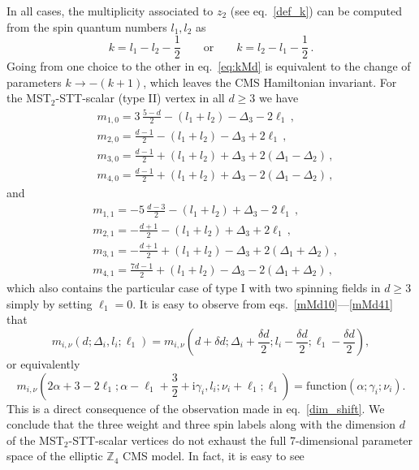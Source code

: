 \documentclass{article}
\def \Dg {\Delta}
\def \dg {\delta}
\def \ag {\alpha}
\def \cg {\gamma}
\def \Zs {\mathbb{Z}}
\begin{document}
In all cases, the multiplicity associated to $z_2$ (see eq.\ \eqref{def_k}) can be computed from the spin quantum numbers 
$l_1,l_2$ as 
\begin{equation} \label{eq:kMd} 
k = l_1 -l_2 - \frac{1}{2} \qquad \mathrm{or} \qquad k= l_2-l_1-\frac{1}{2}\,.
\end{equation}
Going from one choice to the other in eq.\ \eqref{eq:kMd} is equivalent to the change of parameters $k \rightarrow -(k+1)$, which leaves the CMS Hamiltonian invariant. For the MST$_2$-STT-scalar (type II) vertex in all $d\geq 3$ we have
\begin{align}
&m_{1,0} = 3\, \frac{5-d}{2}-(l_1+l_2)-\Dg_3-2\ell_1\,, \label{mMd10} \\
&m_{2,0} = \frac{d-1}{2}-(l_1+l_2)-\Dg_3+2\ell_1\,, \label{mMd20} \\
&m_{3,0} = \frac{d-1}{2}+(l_1+l_2) + \Dg_3+2(\Dg_1-\Dg_2)\,, \label{mMd30}\\
& m_{4,0} = \frac{d-1}{2}+(l_1+l_2) + \Dg_3-2(\Dg_1-\Dg_2)\,, \label{mMd40}
\end{align}
and 
\begin{align}
&m_{1,1} =-5\, \frac{d-3}{2}-(l_1+l_2)+\Dg_3-2\ell_1 \,, \label{mMd11} \\
&m_{2,1} = -\frac{d+1}{2}-(l_1+l_2)+\Dg_3+2\ell_1\,,  \label{mMd21}\\
&m_{3,1} = -\frac{d+1}{2}+(l_1+l_2)- \Dg_3+2(\Dg_1+\Dg_2)\,,  \label{mMd31}\\
&m_{4,1} = \frac{7d-1}{2}+(l_1+l_2)- \Dg_3-2(\Dg_1+\Dg_2) \,,\label{mMd41} 
\end{align}
which also contains the particular case of type I with two spinning fields in $d\geq 3$ simply by setting $\ell_1=0$. It is easy to 
observe from eqs.\ \eqref{mMd10}---\eqref{mMd41} that 
\begin{equation}
m_{i,\nu}(d; \Dg_i, l_i;\ell_1)  = m_{i,\nu}\left( d+\dg d; \Dg_i+ \frac{\dg d}{2};l_i- \frac{\dg d}{2};\ell_1-\frac{\dg d}{2} \right),
\end{equation}
or equivalently 
\begin{equation}
m_{i,\nu}(2\ag+3-2\ell_1; \ag-\ell_1+\frac{3}{2}+\mathrm{i}\cg_i, l_i;\nu_i+\ell_1;\ell_1)  = \mathrm{function}\left( \ag;\cg_i;\nu_i \right).
\end{equation}
This is a direct consequence of the observation made in eq.\ \eqref{dim_shift}. We conclude that the three weight and three 
spin labels along with the dimension $d$ of the MST$_2$-STT-scalar vertices do not exhaust the full 7-dimensional parameter space of 
the elliptic $\Zs_4$ CMS model. In fact, it is easy to see 
\end{document}
